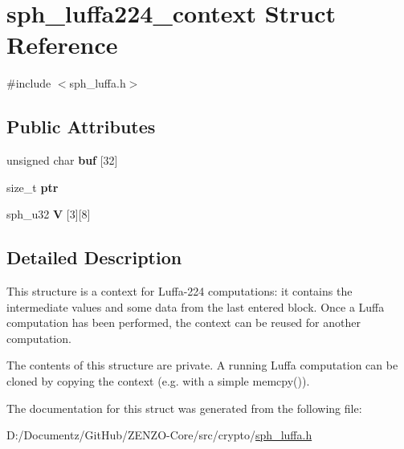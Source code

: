 \hypertarget{structsph__luffa224__context}{}\section{sph\+\_\+luffa224\+\_\+context Struct Reference}
\label{structsph__luffa224__context}


{\ttfamily \#include $<$sph\+\_\+luffa.\+h$>$}

\subsection*{Public Attributes}
\begin{DoxyCompactItemize}
\item 
\mbox{\label{structsph__luffa224__context_ad6cc353326e629ce48de2486870ff0b6}} 
unsigned char {\bfseries buf} \mbox{[}32\mbox{]}
\item 
\mbox{\label{structsph__luffa224__context_a9b262de3994c59a1cbea33de785355c8}} 
size\+\_\+t {\bfseries ptr}
\item 
\mbox{\label{structsph__luffa224__context_ad2adb6333eb0d783338dcf17866d91dd}} 
sph\+\_\+u32 {\bfseries V} \mbox{[}3\mbox{]}\mbox{[}8\mbox{]}
\end{DoxyCompactItemize}


\subsection{Detailed Description}
This structure is a context for Luffa-\/224 computations\+: it contains the intermediate values and some data from the last entered block. Once a Luffa computation has been performed, the context can be reused for another computation.

The contents of this structure are private. A running Luffa computation can be cloned by copying the context (e.\+g. with a simple {\ttfamily memcpy()}). 

The documentation for this struct was generated from the following file\+:\begin{DoxyCompactItemize}
\item 
D\+:/\+Documentz/\+Git\+Hub/\+Z\+E\+N\+Z\+O-\/\+Core/src/crypto/\mbox{\hyperlink{sph__luffa_8h}{sph\+\_\+luffa.\+h}}\end{DoxyCompactItemize}
